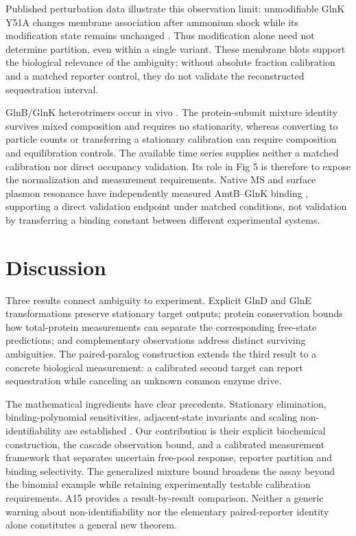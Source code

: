 \documentclass[10pt,letterpaper]{article}
\begin{document}
Published perturbation data illustrate this observation limit: unmodifiable GlnK Y51A changes membrane association after ammonium shock while its modification state remains unchanged \cite{r80}. Thus modification alone need not determine partition, even within a single variant. These membrane blots support the biological relevance of the ambiguity; without absolute fraction calibration and a matched reporter control, they do not validate the reconstructed sequestration interval.

GlnB/GlnK heterotrimers occur in vivo \cite{r78}. The protein-subunit mixture identity survives mixed composition and requires no stationarity, whereas converting to particle counts or transferring a stationary calibration can require composition and equilibration controls. The available time series supplies neither a matched calibration nor direct occupancy validation. Its role in Fig 5 is therefore to expose the normalization and measurement requirements. Native MS and surface plasmon resonance have independently measured AmtB--GlnK binding \cite{r79}, supporting a direct validation endpoint under matched conditions, not validation by transferring a binding constant between different experimental systems.

\section*{Discussion}

Three results connect ambiguity to experiment. Explicit GlnD and GlnE transformations preserve stationary target outputs; protein conservation bounds how total-protein measurements can separate the corresponding free-state predictions; and complementary observations address distinct surviving ambiguities. The paired-paralog construction extends the third result to a concrete biological measurement: a calibrated second target can report sequestration while canceling an unknown common enzyme drive.

The mathematical ingredients have clear precedents. Stationary elimination, binding-polynomial sensitivities, adjacent-state invariants and scaling non-identifiability are established \cite{r4,r22,r23,r24,r26,r27,r76,r72,r73}. Our contribution is their explicit biochemical construction, the cascade observation bound, and a calibrated measurement framework that separates uncertain free-pool response, reporter partition and binding selectivity. The generalized mixture bound broadens the assay beyond the binomial example while retaining experimentally testable calibration requirements. A15 provides a result-by-result comparison. Neither a generic warning about non-identifiability nor the elementary paired-reporter identity alone constitutes a general new theorem.
\end{document}
